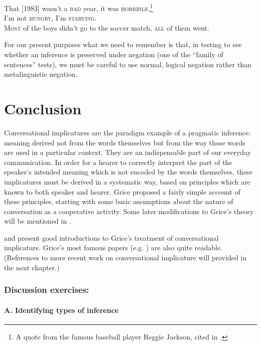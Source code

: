 \ea \label{ex:8.29}
\ea That [1983] wasn’t a \textsc{bad} year, it was \textsc{horrible}.\footnote{A quote from the famous baseball player Reggie Jackson, cited in \citet[382]{Horn1989}.}\\
\ex I’m not \textsc{hungry}, I’m \textsc{starving}.\\
\ex \textsc{Most} of the boys didn’t go to the soccer match, \textsc{all} of them went.
                       \z
\z


For our present purposes what we need to remember is that, in testing to see whether an inference is preserved under negation (one of the “family of sentences” tests), we must be careful to use normal, logical negation rather than metalinguistic negation.


\section{Conclusion}\label{sec:} %

Conversational implicatures are the paradigm example of a pragmatic inference: meaning derived not from the words themselves but from the way those words are used in a particular context. They are an indispensable part of our everyday communication. In order for a hearer to correctly interpret the part of the speaker’s intended meaning which is not encoded by the words themselves, these implicatures must be derived in a systematic way, based on principles which are known to both speaker and hearer. Grice proposed a fairly simple account of these principles, starting with some basic assumptions about the nature of conversation as a cooperative activity. Some later modifications to Grice’s theory will be mentioned in .



\furtherreading



\citet[ch. 3]{Levinson1983} and \citet[ch. 2]{Birner2013} present good introductions to Grice’s treatment of conversational implicature. Grice’s most famous papers (e.g. \citeyear{Grice1975,Grice1978,Grice1981}) are also quite readable. (References to more recent work on conversational implicature will provided in the next chapter.)


\subsubsection{Discussion exercises:}\label{sec:}
\paragraph{A. Identifying types of inference}

